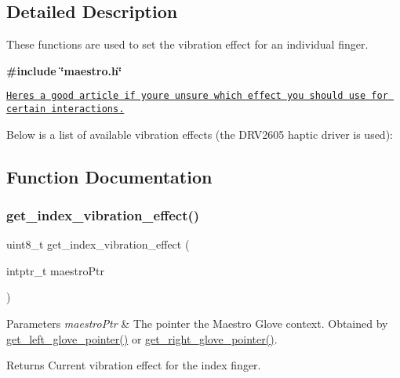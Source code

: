 \subsection{Detailed Description}
These functions are used to set the vibration effect for an individual finger. 

{\bfseries {\ttfamily \#include \char`\"{}maestro.\+h\char`\"{}}}

\href{https://www.precisionmicrodrives.com/tech-blog/2015/12/16/which-haptic-effects-should-you-use}{\tt Here\textquotesingle{}s a good article if you\textquotesingle{}re unsure which effect you should use for certain interactions.}

Below is a list of available vibration effects (the D\+R\+V2605 haptic driver is used)\+:  

\subsection{Function Documentation}
\mbox{\label{group__vibration_control_ga4902e5e4253a07ab5b123a714f2bff0c}} 
\subsubsection{\texorpdfstring{get\+\_\+index\+\_\+vibration\+\_\+effect()}{get\_index\_vibration\_effect()}}
{\footnotesize\ttfamily uint8\+\_\+t get\+\_\+index\+\_\+vibration\+\_\+effect (\begin{DoxyParamCaption}\item[{intptr\+\_\+t}]{maestro\+Ptr }\end{DoxyParamCaption})}


\begin{DoxyParams}{Parameters}
{\em maestro\+Ptr} & The pointer the Maestro Glove context. Obtained by \hyperlink{group__glove_management_ga63ce3c99d4a8b8db851b22af9185764e}{get\+\_\+left\+\_\+glove\+\_\+pointer()} or \hyperlink{group__glove_management_ga9b8fd9d91aeac3f8da50f7a7eba0c32b}{get\+\_\+right\+\_\+glove\+\_\+pointer()}. \\
\hline
\end{DoxyParams}
\begin{DoxyReturn}{Returns}
Current vibration effect for the index finger. 
\end{DoxyReturn}
\mbox{\label{group__vibration_control_gab0516e0a1963f208e192e24f64dde42e}} 
